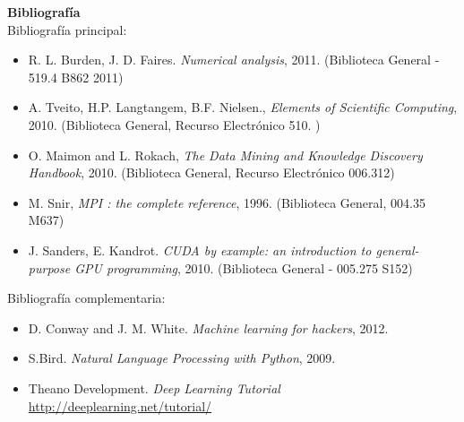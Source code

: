 \documentclass[letterpaper,10pt,onecolumn]{article}
\begin{document}
\noindent\textbf{\large {} \quad
  Bibliograf\'ia}\\[-0.2cm] 


\noindent\normalsize Bibliograf\'ia principal:

\begin{itemize}
\item R. L. Burden, J. D. Faires. \textit{Numerical analysis},
  2011. (Biblioteca General - 519.4 B862 2011)\\[-0.6cm]
\item A. Tveito, H.P. Langtangem, B.F. Nielsen., \textit{Elements of
  Scientific Computing}, 2010.  (Biblioteca General, Recurso
  Electr\'onico 510. )\\[-0.6cm] 
\item O. Maimon and L. Rokach, \textit{The Data Mining and Knowledge
  Discovery Handbook}, 2010. (Biblioteca General, Recurso
  Electr\'onico 006.312)\\[-0.6cm]
\item M. Snir, \textit{MPI : the complete reference},
  1996. (Biblioteca General, 004.35 M637)\\[-0.6cm]
\item J. Sanders, E. Kandrot. \textit{CUDA by example: an
  introduction to general-purpose GPU programming}, 2010. (Biblioteca
  General - 005.275 S152)\\[-0.2cm]
\end{itemize} 

\noindent\normalsize Bibliograf\'ia complementaria:

\begin{itemize}
\item D. Conway and J. M. White. \textit{Machine learning for
    hackers}, 2012.\\[-0.6cm]
\item S.Bird. \textit{Natural Language Processing with
  Python}, 2009.\\[-0.6cm]
\item Theano Development. \textit{Deep Learning Tutorial}
  \url{http://deeplearning.net/tutorial/}  \\[-0.2cm]
\end{itemize}
\end{document}
